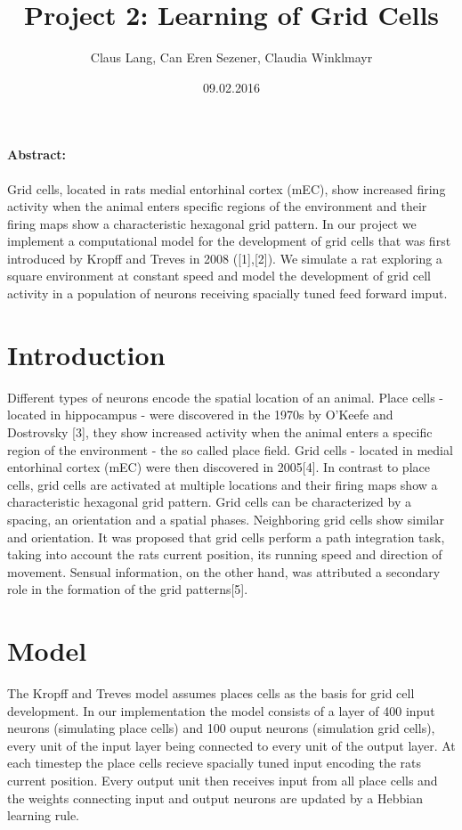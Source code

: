 \documentclass[a4paper, 12pt]{article}
\title{Project 2: Learning of Grid Cells}
\author{Claus Lang, Can Eren Sezener, Claudia Winklmayr}
\date{09.02.2016}
\begin{document}
\maketitle

\paragraph{Abstract:}
Grid cells, located in rats medial entorhinal cortex (mEC), show increased firing activity when the animal enters specific regions of the environment and their firing maps show a characteristic hexagonal grid pattern. In our project we implement a computational model for the development of grid cells that was first introduced by Kropff and Treves in 2008 ([1],[2]). We simulate a rat exploring a square environment at constant speed and model the development of grid cell activity in a population of neurons receiving spacially tuned feed forward imput. 
 

\section{Introduction}
Different types of neurons encode the spatial location of an animal. Place cells - located in hippocampus - were discovered in the 1970s by O'Keefe and Dostrovsky [3], they show increased activity when the animal enters a specific region of the environment - the so called place field.\newline
Grid cells - located in medial entorhinal cortex (mEC) were then discovered in 2005[4]. In contrast to place cells, grid cells are activated at multiple locations and their firing maps show a characteristic hexagonal grid pattern. Grid cells can be characterized by a spacing, an orientation and a spatial phases. Neighboring grid cells show similar and orientation. \newline
It was proposed that grid cells perform a path integration task, taking into account the rats current position, its running speed and direction of movement. Sensual information, on the other hand, was attributed a secondary role in the formation of the grid patterns[5]. \newline
%
%
%
\section{Model}
The Kropff and Treves model assumes places cells as the basis for grid cell development. In our implementation the model consists of a layer of 400 input neurons (simulating place cells) and 100 ouput neurons (simulation grid cells), every unit of the input layer being connected to every unit of the output layer. At each timestep the place cells recieve spacially tuned input encoding the rats current position. Every output unit then receives input from all place cells and the weights connecting input and output neurons are updated by a Hebbian learning rule. 
\end{document}
